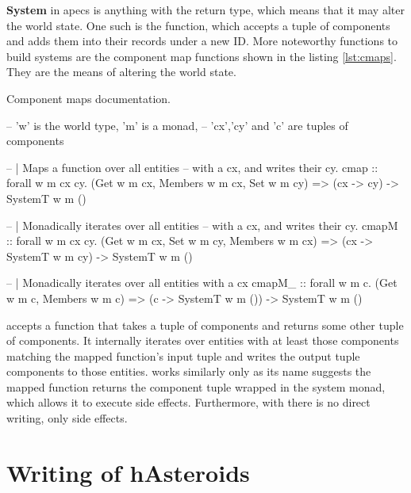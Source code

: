 \documentclass[
  digital, %
  color,   %
  table,   %
  oneside, %
  lof,     %
  lot,     %
]{fithesis3}
\begin{document}
\textbf{System} in apecs is anything with the  return type, which
means that it may alter the world state.
One such  is the  function, which
accepts a tuple of components and adds them into their records under a new ID.
More noteworthy functions to build systems are the component map functions
shown in the listing \ref{lst:cmaps}. They are the means of altering the world state.
\begin{listing}[H]
\caption{Component maps documentation.\cite{apecsdocs}}
\begin{haskell}
-- 'w' is the world type, 'm' is a monad,
-- 'cx','cy' and 'c' are tuples of components

-- | Maps a function over all entities
--   with a cx, and writes their cy.
cmap :: forall w m cx cy.
    (Get w m cx, Members w m cx, Set w m cy) =>
    (cx -> cy) -> SystemT w m ()

-- | Monadically iterates over all entities
--   with a cx, and writes their cy.
cmapM :: forall w m cx cy.
    (Get w m cx, Set w m cy, Members w m cx) =>
    (cx -> SystemT w m cy) -> SystemT w m ()

-- | Monadically iterates over all entities with a cx
cmapM_ :: forall w m c.
    (Get w m c, Members w m c) =>
    (c -> SystemT w m ()) -> SystemT w m ()
\end{haskell}
\label{lst:cmaps}
\end{listing}
 accepts a function that takes a tuple of components
and returns some other tuple of components. It internally iterates
over entities with at least those components matching the mapped
function's input tuple and writes the output tuple components
to those entities.  works similarly
only as its name suggests the mapped function returns the component
tuple wrapped in the system monad, which allows it to execute side effects.
Furthermore, with  there is no direct writing, only side effects.



\section{Writing of hAsteroids}
\end{document}
